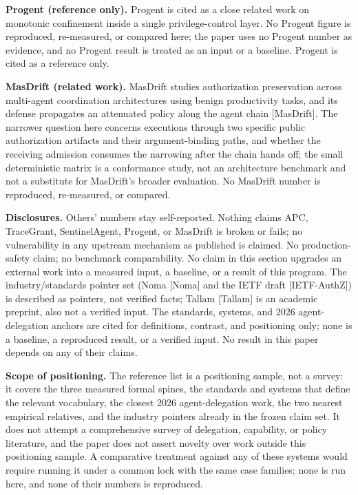 \documentclass[
  10pt,
]{article}
\newcounter{none} %
\renewcommand{\_}{\allowbreak\origunderscore}
\begin{document}
\textbf{Progent (reference only).} Progent is cited as a close related
work on monotonic confinement inside a single privilege-control layer.
No Progent figure is reproduced, re-measured, or compared here; the
paper uses no Progent number as evidence, and no Progent result is
treated as an input or a baseline. Progent is cited as a reference only.

\textbf{MasDrift (related work).} MasDrift studies authorization
preservation across multi-agent coordination architectures using benign
productivity tasks, and its defense propagates an attenuated policy
along the agent chain {[}MasDrift{]}. The narrower question here
concerns executions through two specific public authorization artifacts
and their argument-binding paths, and whether the receiving admission
consumes the narrowing after the chain hands off; the small
deterministic matrix is a conformance study, not an architecture
benchmark and not a substitute for MasDrift's broader evaluation. No
MasDrift number is reproduced, re-measured, or compared.

\textbf{Disclosures.} Others' numbers stay self-reported. Nothing claims
APC, TraceGrant, SentinelAgent, Progent, or MasDrift is broken or fails;
no vulnerability in any upstream mechanism as published is claimed. No
production-safety claim; no benchmark comparability. No claim in this
section upgrades an external work into a measured input, a baseline, or
a result of this program. The industry/standards pointer set (Noma
{[}Noma{]} and the IETF draft {[}IETF-AuthZ{]}) is described as
pointers, not verified facts; Tallam {[}Tallam{]} is an academic
preprint, also not a verified input. The standards, systems, and 2026
agent-delegation anchors are cited for definitions, contrast, and
positioning only; none is a baseline, a reproduced result, or a verified
input. No result in this paper depends on any of their claims.

\textbf{Scope of positioning.} The reference list is a positioning
sample, not a survey: it covers the three measured formal spines, the
standards and systems that define the relevant vocabulary, the closest
2026 agent-delegation work, the two nearest empirical relatives, and the
industry pointers already in the frozen claim set. It does not attempt a
comprehensive survey of delegation, capability, or policy literature,
and the paper does not assert novelty over work outside this positioning
sample. A comparative treatment against any of these systems would
require running it under a common lock with the same case families; none
is run here, and none of their numbers is reproduced.
\end{document}
